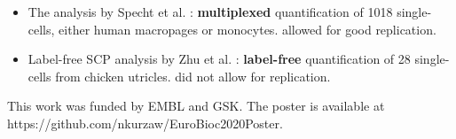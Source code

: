 \documentclass{article}
\begin{document}
\begin{multicols}{2}
\begin{minipage}[t]{\linewidth}
  \begin{itemize}
    \item The analysis by Specht et al. \cite{Specht2020-jm}: 
    \textbf{multiplexed} quantification of 1018 single-cells, either 
    human macropages or monocytes. \textbf{\color{OliveGreen}{Good 
    documentation}} allowed for good replication.
    \item Label-free SCP analysis by Zhu et al. \cite{Zhu2019-ja}: 
    \textbf{label-free} quantification of 28 single-cells from chicken 
    utricles. \textbf{\color{BrickRed}{Poor documentation}} did not 
    allow for replication.
  \end{itemize}
  
\end{minipage}

\scriptsize
 


\noindent
This work was funded by EMBL and GSK. The poster is available at {\color{blue}
{https://github.com/nkurzaw/EuroBioc2020Poster}}.

\end{multicols}
\end{document}
